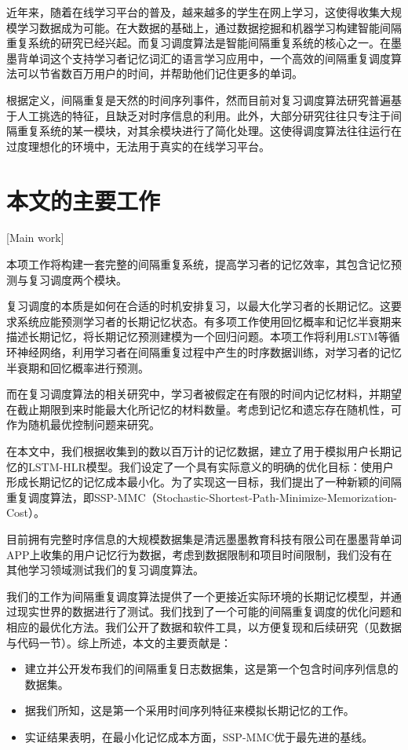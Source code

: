 近年来，随着在线学习平台的普及，越来越多的学生在网上学习，这使得收集大规模学习数据成为可能。在大数据的基础上，通过数据挖掘和机器学习构建智能间隔重复系统的研究已经兴起。而复习调度算法是智能间隔重复系统的核心之一。在墨墨背单词这个支持学习者记忆词汇的语言学习应用中，一个高效的间隔重复调度算法可以节省数百万用户的时间，并帮助他们记住更多的单词。

根据定义，间隔重复是天然的时间序列事件，然而目前对复习调度算法研究普遍基于人工挑选的特征，且缺乏对时序信息的利用。此外，大部分研究往往只专注于间隔重复系统的某一模块，对其余模块进行了简化处理。这使得调度算法往往运行在过度理想化的环境中，无法用于真实的在线学习平台。

\section{本文的主要工作}[Main work]

本项工作将构建一套完整的间隔重复系统，提高学习者的记忆效率，其包含记忆预测与复习调度两个模块。

复习调度的本质是如何在合适的时机安排复习，以最大化学习者的长期记忆。这要求系统应能预测学习者的长期记忆状态。有多项工作使用回忆概率和记忆半衰期来描述长期记忆，将长期记忆预测建模为一个回归问题。本项工作将利用LSTM等循环神经网络，利用学习者在间隔重复过程中产生的时序数据训练，对学习者的记忆半衰期和回忆概率进行预测。

而在复习调度算法的相关研究中，学习者被假定在有限的时间内记忆材料，并期望在截止期限到来时能最大化所记忆的材料数量。考虑到记忆和遗忘存在随机性，可作为随机最优控制问题来研究。

在本文中，我们根据收集到的数以百万计的记忆数据，建立了用于模拟用户长期记忆的LSTM-HLR模型。我们设定了一个具有实际意义的明确的优化目标：使用户形成长期记忆的记忆成本最小化。为了实现这一目标，我们提出了一种新颖的间隔重复调度算法，即SSP-MMC（Stochastic-Shortest-Path-Minimize-Memorization-Cost）。

目前拥有完整时序信息的大规模数据集是清远墨墨教育科技有限公司在墨墨背单词APP上收集的用户记忆行为数据，考虑到数据限制和项目时间限制，我们没有在其他学习领域测试我们的复习调度算法。

我们的工作为间隔重复调度算法提供了一个更接近实际环境的长期记忆模型，并通过现实世界的数据进行了测试。我们找到了一个可能的间隔重复调度的优化问题和相应的最优化方法。我们公开了数据和软件工具，以方便复现和后续研究（见数据与代码一节）。综上所述，本文的主要贡献是：

\begin{itemize}
    \item 建立并公开发布我们的间隔重复日志数据集，这是第一个包含时间序列信息的数据集。
    \item 据我们所知，这是第一个采用时间序列特征来模拟长期记忆的工作。
    \item 实证结果表明，在最小化记忆成本方面，SSP-MMC优于最先进的基线。
\end{itemize}

